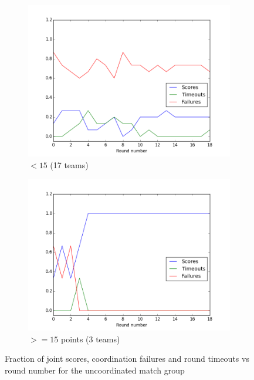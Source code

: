 \begin{figure}
\centering
\begin{subfigure}{.5\textwidth}
\centering
\includegraphics[width=\columnwidth]{figures/scores_uncoordinated_rest.png}
\caption{$< 15$ (17 teams)}
\label{fig:scores_uncoordinated_rest}
\end{subfigure}%
\begin{subfigure}{.5\textwidth}
\centering
\includegraphics[width=\columnwidth]{figures/scores_uncoordinated_15.png}
\caption{$>= 15$ points (3 teams)}
\label{fig:scores_uncoordinated_15}
\end{subfigure}
\caption{Fraction of joint scores, coordination failures and round timeouts vs round number for the uncoordinated match group}
\label{fig:scores_uncoordinated}
\end{figure}


